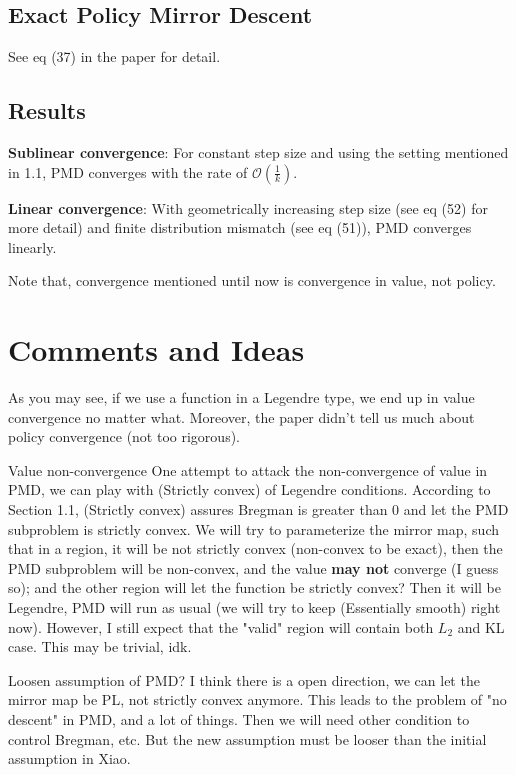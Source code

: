 \documentclass[11pt,a4paper]{article}
\begin{document}
\subsection{Exact Policy Mirror Descent}
See eq (37) in the paper for detail.

\subsection{Results}

\textbf{Sublinear convergence}:
For constant step size and using the setting mentioned in 1.1, PMD converges with the rate of $\mathcal{O}(\frac{1}{k})$.

\textbf{Linear convergence}:
With geometrically increasing step size (see eq (52) for more detail) and finite distribution mismatch (see eq (51)), PMD converges linearly.


\begin{note}
Note that, convergence mentioned until now is convergence in value, not policy.
\end{note}

\newpage

\section{Comments and Ideas}

As you may see, if we use a function in a Legendre type, we end up in value convergence no matter what. Moreover, the paper didn't tell us much about policy convergence (not too rigorous).

\begin{idea}{Value non-convergence}
One attempt to attack the non-convergence of value in PMD, we can play with (Strictly convex) of Legendre conditions. According to Section 1.1, (Strictly convex) assures Bregman is greater than 0 and let the PMD subproblem is strictly convex. We will try to parameterize the mirror map, such that in a region, it will be not strictly convex (non-convex to be exact), then the PMD subproblem will be non-convex, and the value \textbf{may not} converge (I guess so); and the other region will let the function be strictly convex? Then it will be Legendre, PMD will run as usual (we will try to keep (Essentially smooth) right now). However, I still expect that the "valid" region will contain both $L_2$ and KL case. This may be trivial, idk.
\end{idea}

\begin{idea}{Loosen assumption of PMD?}
I think there is a open direction, we can let the mirror map be PL, not strictly convex anymore. This leads to the problem of "no descent" in PMD, and a lot of things. Then we will need other condition to control Bregman, etc. But the new assumption must be looser than the initial assumption in Xiao.
\end{idea}
\end{document}
